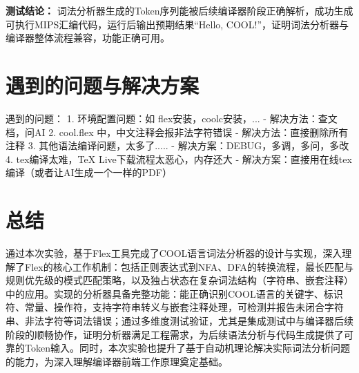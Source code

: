 \documentclass[twocolumn]{article}
\begin{document}
\textbf{测试结论：} 词法分析器生成的Token序列能被后续编译器阶段正确解析，成功生成可执行MIPS汇编代码，运行后输出预期结果“Hello, COOL!”，证明词法分析器与编译器整体流程兼容，功能正确可用。

\section{遇到的问题与解决方案}
遇到的问题：
1. 环境配置问题：如 flex安装，coolc安装，...
- 解决方法：查文档，问AI
2. cool.flex 中，中文注释会报非法字符错误
- 解决方法：直接删除所有注释
3. 其他语法编译问题，太多了.....
- 解决方案：DEBUG，多调，多问，多改
4. tex编译太难，TeX Live下载流程太恶心，内存还大
- 解决方案：直接用在线tex编译（或者让AI生成一个一样的PDF）

\section{总结}

通过本次实验，基于Flex工具完成了COOL语言词法分析器的设计与实现，深入理解了Flex的核心工作机制：包括正则表达式到NFA、DFA的转换流程，最长匹配与规则优先级的模式匹配策略，以及独占状态在复杂词法结构（字符串、嵌套注释）中的应用。实现的分析器具备完整功能：能正确识别COOL语言的关键字、标识符、常量、操作符，支持字符串转义与嵌套注释处理，可检测并报告未闭合字符串、非法字符等词法错误；通过多维度测试验证，尤其是集成测试中与编译器后续阶段的顺畅协作，证明分析器满足工程需求，为后续语法分析与代码生成提供了可靠的Token输入。同时，本次实验也提升了基于自动机理论解决实际词法分析问题的能力，为深入理解编译器前端工作原理奠定基础。
\end{document}
